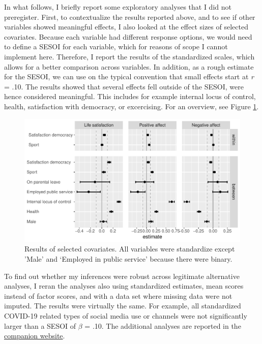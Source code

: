 \documentclass[
  english,
  man,mask,floatsintext]{apa6}
\begin{document}
In what follows, I briefly report some exploratory analyses that I did not preregister.
First, to contextualize the results reported above, and to see if other variables showed meaningful effects, I also looked at the effect sizes of selected covariates.
Because each variable had different response options, we would need to define a SESOI for each variable, which for reasons of scope I cannot implement here.
Therefore, I report the results of the standardized scales,
which allows for a better comparison across variables.
In addition, as a rough estimate for the SESOI, we can use on the typical convention that small effects start at \emph{r} = \textbar.10\textbar.
The results showed that several effects fell outside of the SESOI, were hence considered meaningful.
This includes for example internal locus of control, health, satisfaction with democracy, or excercising.
For an overview, see Figure \ref{fig:res-control}.

\begin{figure}
\includegraphics[width=\textwidth]{figures/fig_results_control_std} \caption{Results of selected covariates. All variables were standardize except 'Male'  and ‘Employed in public service' because there were binary.}\label{fig:res-control}
\end{figure}

To find out whether my inferences were robust across legitimate alternative analyses, I reran the analyses also using standardized estimates, mean scores instead of factor scores, and with a data set where missing data were not imputed.
The results were virtually the same.
For example, all standardized COVID-19 related types of social media use or channels were not significantly larger than a SESOI of \(\beta\) = \textbar.10\textbar.
The additional analyses are reported in the \href{https://xmtra.github.io/Austrian_Corona_Panel_Project/analyses_additional.html}{companion website}.
\end{document}

